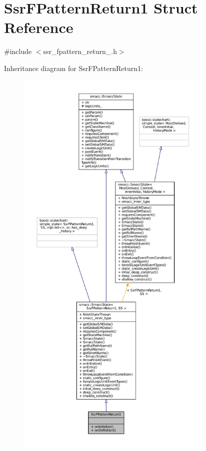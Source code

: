\hypertarget{structSsrFPatternReturn1}{}\section{Ssr\+F\+Pattern\+Return1 Struct Reference}
\label{structSsrFPatternReturn1}


{\ttfamily \#include $<$ssr\+\_\+fpattern\+\_\+return\+\_.\+h$>$}



Inheritance diagram for Ssr\+F\+Pattern\+Return1\+:
\nopagebreak
\begin{figure}[H]
\begin{center}
\leavevmode
\includegraphics[height=550pt]{structSsrFPatternReturn1__inherit__graph}
\end{center}
\end{figure}


